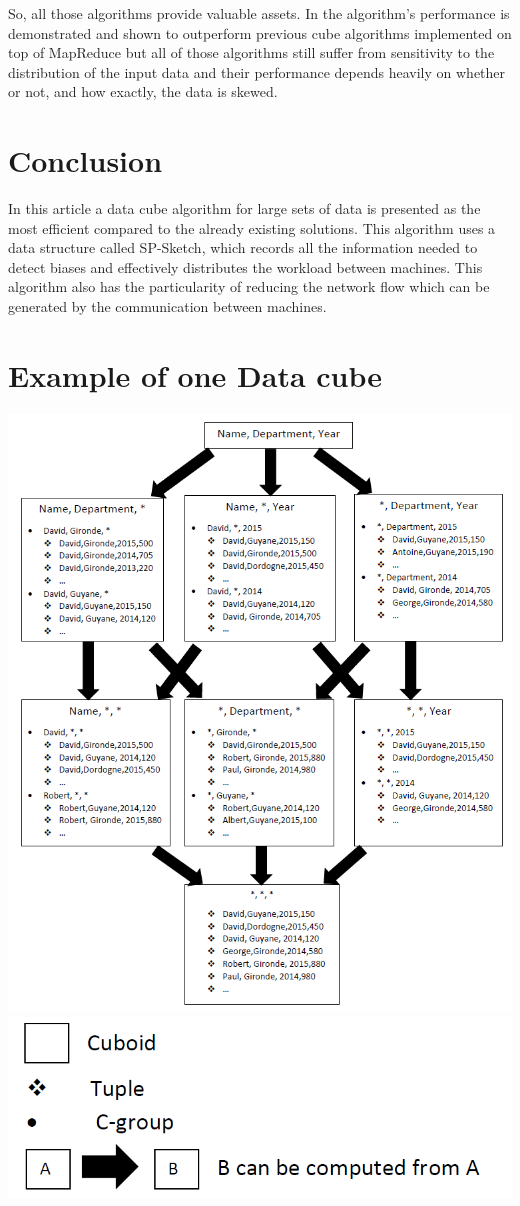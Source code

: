 \documentclass[10pt,journal,compsoc]{IEEEtran}
\begin{document}
So, all those algorithms provide valuable assets. In \cite{anandi} the algorithm's performance
is demonstrated and shown to outperform previous cube algorithms implemented on top of MapReduce but all of those algorithms still suffer from sensitivity to the distribution of the input data and their performance depends heavily on whether or not, and how exactly, the data is skewed.
\section{Conclusion}\label{sec:conclusion}
In this article a data cube algorithm for large sets of data is presented as the most efficient compared to the already existing solutions.
This algorithm uses a data structure called SP-Sketch, which records all the information needed to detect biases and effectively distributes the workload between machines. This algorithm also has the particularity of reducing the network flow which can be generated by the communication between machines.



\appendices
\section{Example of one Data cube}
\includegraphics[scale=0.5]{data_cube_example}
\includegraphics[scale=0.25]{legend_data_cube}
\end{document}
